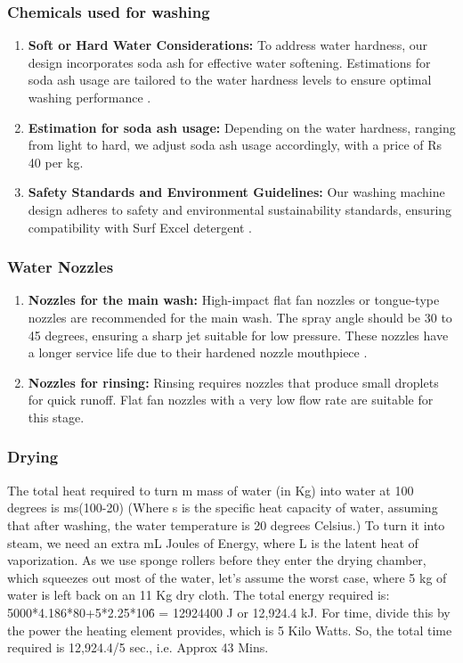 \documentclass[12pt]{article} %
\begin{document}
   \subsubsection{Chemicals used for washing}
   \begin{enumerate}
   \item \textbf{Soft or Hard Water Considerations:} To address water hardness, our design incorporates soda ash for effective water softening. Estimations for soda ash usage are tailored to the water hardness levels to ensure optimal washing performance \cite{cleanwaterstore_2024_hardness}.
   \item \textbf{Estimation for soda ash usage:} Depending on the water hardness, ranging from light to hard, we adjust soda ash usage accordingly, with a price of Rs 40 per kg.
   \item \textbf{Safety Standards and Environment Guidelines:} Our washing machine design adheres to safety and environmental sustainability standards, ensuring compatibility with Surf Excel detergent \cite{unilever_2024_safety_environment}.
   \end{enumerate}

\subsubsection{Water Nozzles} 
\begin{enumerate}
\item \textbf{Nozzles for the main wash:} High-impact flat fan nozzles or tongue-type nozzles are recommended for the main wash. The spray angle should be 30 to 45 degrees, ensuring a sharp jet suitable for low pressure. These nozzles have a longer service life due to their hardened nozzle mouthpiece \cite{lechler_2024_nozzles_washing}.
\item \textbf{Nozzles for rinsing:} Rinsing requires nozzles that produce small droplets for quick runoff. Flat fan nozzles with a very low flow rate are suitable for this stage.
\end{enumerate}

\subsubsection{Drying}
The total heat required to turn m mass of water (in Kg) into water at 100 degrees is ms(100-20) (Where s is the specific heat capacity of water, assuming that after washing, the water temperature is 20 degrees Celsius.) To turn it into steam, we need an extra mL Joules of Energy, where L is the latent heat of vaporization. As we use sponge rollers before they enter the drying chamber, which squeezes out most of the water, let's assume the worst case, where 5 kg of water is left back on an 11 Kg dry cloth. The total energy required is: 5000*4.186*80+5*2.25*10\^6 = 12924400 J or 12,924.4 kJ. For time, divide this by the power the heating element provides, which is 5 Kilo Watts. So, the total time required is 12,924.4/5 sec., i.e. Approx 43 Mins.
\end{document}

